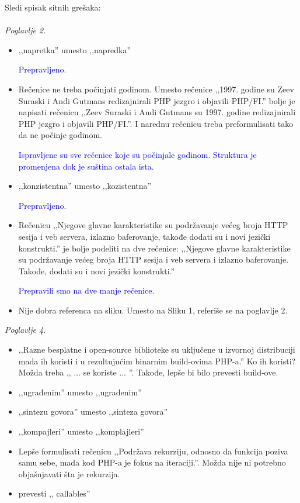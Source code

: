 \documentclass[a4paper]{report}
\newcommand{\odgovor}[1]{\textcolor{blue}{#1}}
\begin{document}
Sledi spisak sitnih grešaka:\\\\

\textit{Poglavlje 2.}
\begin{itemize}
\item ‚‚napretka'' umesto ‚‚napredka''

\odgovor{Prepravljeno.}

\item Rečenice ne treba počinjati godinom. Umesto rečenice ,,1997. godine su Zeev Suraski i Andi Gutmans redizajnirali PHP jezgro i objavili PHP/FI.'' bolje je napisati rečenicu ,,Zeev Suraski i Andi Gutmans su 1997. godine redizajnirali PHP jezgro i objavili PHP/FI.''. I narednu rečenicu treba preformulisati tako da ne počinje godinom.

\odgovor{Ispravljene su sve rečenice koje su počinjale godinom. Struktura je promenjena dok je suština ostala ista.}

\item ‚‚konzistentna'' umesto ‚‚kozistentna''

\odgovor{Prepravljeno.}

\item Rečenicu ‚‚Njegove glavne karakteristike su podržavanje većeg broja HTTP sesija i veb servera, izlazno baferovanje, takođe dodati su i novi jezički konstrukti.'' je bolje podeliti na dve rečenice: ‚‚Njegove glavne karakteristike su podržavanje većeg broja HTTP sesija i veb servera i izlazno baferovanje. Takođe, dodati su i novi jezički konstrukti.''

\odgovor{Prepravili smo na dve manje rečenice.}

\item Nije dobra referenca na sliku. Umesto na Sliku 1, referiše se na poglavlje 2.\\
\end{itemize}

\textit{Poglavlje 4.}
\begin{itemize}
\item ‚‚Razne besplatne i open-source biblioteke su uključene u izvornoj distribuciji mada ih koristi i u rezultujućim binarnim build-ovima PHP-a.'' Ko ih koristi? Možda treba ,, ... se koriste ... ''. Takođe, lepše bi bilo prevesti build-ove.
\item ‚‚ugrađenim'' umesto ‚‚ugradenim''
\item ‚‚sintezu govora'' umesto ‚‚sinteza govora''
\item ‚‚kompajleri'' umesto ‚‚komplajleri''
\item Lepše formulisati rečenicu ‚‚Podržava rekurziju, odnosno da funkcija poziva samu sebe, mada kod PHP-a je fokus na iteraciji.''. Možda nije ni potrebno objašnjavati šta je rekurzija.
\item prevesti ,, callables''\\
\end{itemize}
\end{document}
